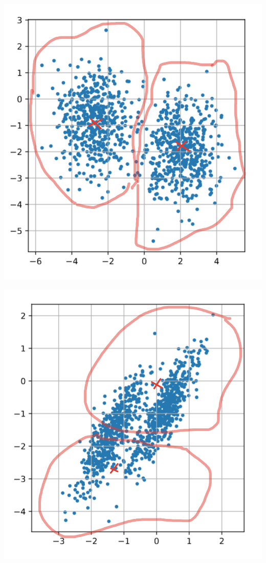 \documentclass[12pt, a4paper, oneside]{article}
\begin{document}
{\begin{minipage}[t]{0.45\textwidth}
	\includegraphics[scale=0.15]{cloudss.png}
\end{minipage}
\hfill
\begin{minipage}[t]{0.45\textwidth}
		\includegraphics[scale=0.15]{cloudss2.png}
\end{minipage}



}
\end{document}
